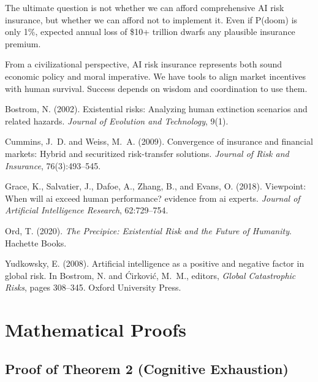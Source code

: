 \documentclass[11pt]{article}
\begin{document}
The ultimate question is not whether we can afford comprehensive AI risk insurance, but whether we can afford not to implement it. Even if P(doom) is only 1\%, expected annual loss of \$10+ trillion dwarfs any plausible insurance premium.

From a civilizational perspective, AI risk insurance represents both sound economic policy and moral imperative. We have tools to align market incentives with human survival. Success depends on wisdom and coordination to use them.


\begin{thebibliography}{20}

Bostrom, N. (2002).
\newblock Existential risks: Analyzing human extinction scenarios and related hazards.
\newblock \emph{Journal of Evolution and Technology}, 9(1).

Cummins, J.~D. and Weiss, M.~A. (2009).
\newblock Convergence of insurance and financial markets: Hybrid and securitized risk-transfer solutions.
\newblock \emph{Journal of Risk and Insurance}, 76(3):493--545.

Grace, K., Salvatier, J., Dafoe, A., Zhang, B., and Evans, O. (2018).
\newblock Viewpoint: When will ai exceed human performance? evidence from ai experts.
\newblock \emph{Journal of Artificial Intelligence Research}, 62:729--754.

Ord, T. (2020).
\newblock \emph{The Precipice: Existential Risk and the Future of Humanity}.
\newblock Hachette Books.

Yudkowsky, E. (2008).
\newblock Artificial intelligence as a positive and negative factor in global risk.
\newblock In Bostrom, N. and \'{C}irkovi\'{c}, M.~M., editors, \emph{Global Catastrophic Risks}, pages 308--345. Oxford University Press.

\end{thebibliography}

\appendix

\section{Mathematical Proofs}

\subsection{Proof of Theorem 2 (Cognitive Exhaustion)}
\end{document}
